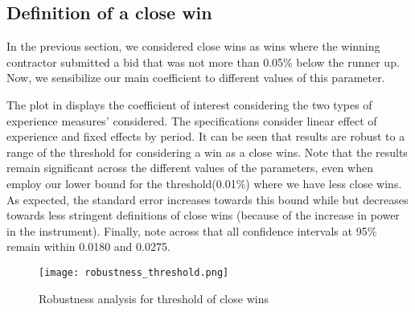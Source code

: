 
\subsection{Definition of a close win}
In the previous section, we considered close wins as wins where the winning contractor submitted a bid that was not more than 0.05\% below the runner up. Now, we sensibilize our main coefficient to different values of this parameter.

 The plot in   displays the coefficient of interest considering the two types of experience measures' considered. The specifications consider linear effect of experience and fixed effects by period. It can be seen that results are robust to a range of the threshold for considering a win as a close wins. Note that the results remain significant across the different values of the parameters, even when  employ our lower bound for the threshold(0.01\%) where we have less close wins. As expected, the standard error increases towards this bound while but decreases towards  less stringent definitions of close wins (because of the increase in power in the instrument). Finally, note across that all confidence intervals at 95\% remain within 0.0180 and 0.0275.

 \begin{figure}[H]
         \centering
         \texttt{[image: robustness\_threshold.png]}
         \caption{Robustness analysis for threshold of close wins}
         \label{fig:close_wins_robust}
     \end{figure}
